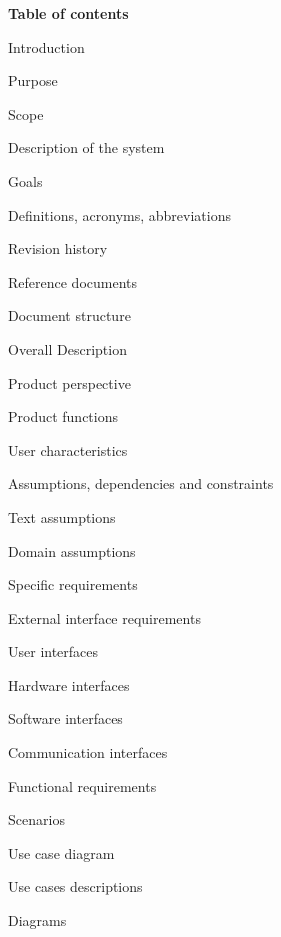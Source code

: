 \documentclass{article}
\begin{document}
\newpage
\textbf{Table of contents}
	\begin{legal}
 	\item Introduction
  		\begin{legal}
    		\item Purpose
		\item Scope
			\begin{legal}
			\item Description of the system
			\item Goals
			\end{legal}
		\item Definitions, acronyms, abbreviations
		\item Revision history
		\item Reference documents
		\item Document structure	
  		\end{legal}
	\item Overall Description
  		\begin{legal}
    		\item Product perspective
		\item Product functions
		\item User characteristics
		\item Assumptions, dependencies and constraints
		\begin{legal}
		\item Text assumptions
		\item Domain assumptions
		\end{legal}
  		\end{legal}
	\item Specific requirements
  		\begin{legal}
    		\item External interface requirements
			\begin{legal}
			\item User interfaces
			\item Hardware interfaces
			\item Software interfaces
			\item Communication interfaces
	  		\end{legal}
		\item Functional requirements
			\begin{legal}
			\item Scenarios
			\item Use case diagram
			\item Use cases descriptions
			\item Diagrams

\end{legal}
\end{legal}
\end{legal}
\end{document}
